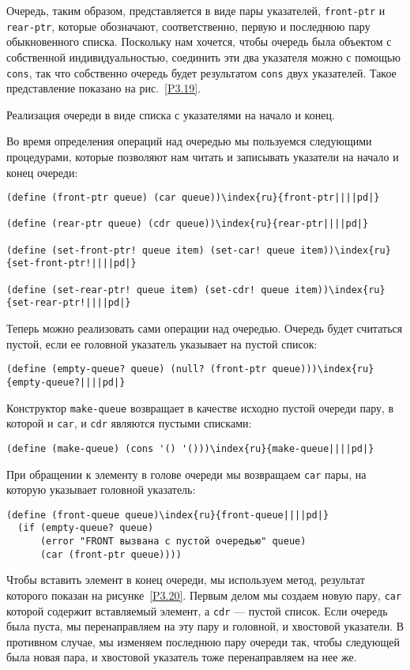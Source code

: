 {Очередь, таким образом, представляется в виде пары
указателей, {\tt front-ptr} и {\tt rear-ptr}, которые
обозначают, соответственно, первую и последнюю пару обыкновенного
списка.  Поскольку нам хочется, чтобы очередь была объектом с
собственной индивидуальностью,  соединить эти два указателя
можно с помощью {\tt cons}, так что собственно очередь будет
результатом {\tt cons} двух указателей.  Такое представление
показано на рис.~\ref{P3.19}.

\sloppy
}%

\begin{cntrfig}

\caption{Реализация очереди в виде списка с
указателями на начало и конец.}
\label{P3.19}

\end{cntrfig}

Во время определения операций над очередью мы пользуемся
следующими процедурами, которые позволяют нам читать и записывать
указатели на начало и конец очереди:

\begin{Verbatim}[fontsize=\small]
(define (front-ptr queue) (car queue))\index{ru}{front-ptr||||pd|}

(define (rear-ptr queue) (cdr queue))\index{ru}{rear-ptr||||pd|}

(define (set-front-ptr! queue item) (set-car! queue item))\index{ru}{set-front-ptr!||||pd|}

(define (set-rear-ptr! queue item) (set-cdr! queue item))\index{ru}{set-rear-ptr!||||pd|}
\end{Verbatim}

Теперь можно реализовать сами операции над очередью.
Очередь будет считаться пустой, если ее головной указатель указывает на пустой
список:

\begin{Verbatim}[fontsize=\small]
(define (empty-queue? queue) (null? (front-ptr queue)))\index{ru}{empty-queue?||||pd|}
\end{Verbatim}
Конструктор {\tt make-queue} возвращает в качестве исходно
пустой очереди пару, в которой и {\tt car}, и {\tt cdr}
являются пустыми списками:

\begin{Verbatim}[fontsize=\small]
(define (make-queue) (cons '() '()))\index{ru}{make-queue||||pd|}
\end{Verbatim}
При обращении к элементу в голове очереди мы возвращаем {\tt car}
пары, на которую указывает головной указатель:

\begin{Verbatim}[fontsize=\small]
(define (front-queue queue)\index{ru}{front-queue||||pd|}
  (if (empty-queue? queue)
      (error "FRONT вызвана с пустой очередью" queue)
      (car (front-ptr queue))))
\end{Verbatim}
Чтобы вставить элемент в конец очереди, мы используем метод, результат
которого показан на рисунке~\ref{P3.20}.  Первым делом мы
создаем новую пару, {\tt car} которой содержит вставляемый
элемент, а {\tt cdr} --- пустой список.  Если очередь была
пуста, мы перенаправляем на эту пару и головной, и хвостовой указатели.
В противном случае, мы изменяем последнюю пару очереди так, чтобы
следующей была новая пара, и хвостовой указатель тоже перенаправляем на
нее же.

